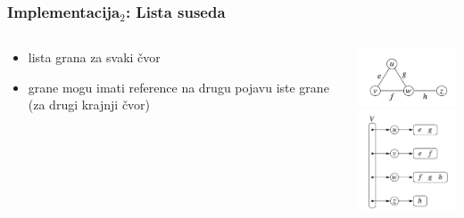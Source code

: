 \documentclass[compress]{beamer}
\begin{document}
\begin{frame}[fragile]
  \frametitle{Implementacija$_2$: Lista suseda}
  \begin{columns}
    \begin{column}[t]{6cm}
      \begin{itemize}
        \item lista grana za svaki čvor
        \item grane mogu imati reference na drugu pojavu iste grane (za 
          drugi krajnji čvor)
      \end{itemize}
    \end{column}
    \begin{column}[t]{6cm}
      \begin{center}
        \includegraphics[width=4cm]{asp-14-pic10.png} \\
        \includegraphics[width=4cm]{asp-14-pic11.png}
      \end{center}
    \end{column}
  \end{columns}
\end{frame}
\end{document}
